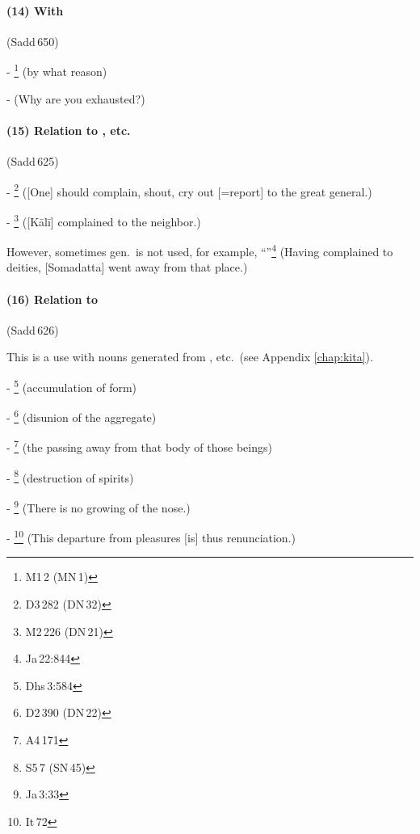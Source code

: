 \paragraph*{(14) With } (Sadd\,650)\par
- \footnote{M1\,2 (MN\,1)} (by what reason)\par
-  (Why are you exhausted?)\par

\paragraph*{(15) Relation to , etc.} (Sadd\,625)\par
- \footnote{D3\,282 (DN\,32)} ([One] should complain, shout, cry out [=report] to the great general.)\par
- \footnote{M2\,226 (DN\,21)} ([K\=al\=i] complained to the neighbor.)\par
However, sometimes gen.\ is not used, for example, ``''\footnote{Ja\,22:844} (Having complained to deities, [Somadatta] went away from that place.)\par

\paragraph*{(16) Relation to } (Sadd\,626)\par
This is a use with  nouns generated from , etc.\ (see Appendix \ref{chap:kita}).\par
- \footnote{Dhs\,3:584} (accumulation of form)\par
- \footnote{D2\,390 (DN\,22)} (disunion of the aggregate)\par
- \footnote{A4\,171} (the passing away from that body of those beings)\par
- \footnote{S5\,7 (SN\,45)} (destruction of spirits)\par
- \footnote{Ja\,3:33} (There is no growing of the nose.)\par
- \footnote{It\,72} (This departure from pleasures [is] thus renunciation.)\par

